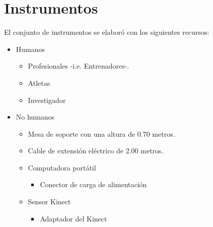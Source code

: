 \section{Instrumentos}\label{ins}
El conjunto de instrumentos se elabor\'o con los  siguientes recursos:
\begin{itemize}
\item Humanos
	\begin{itemize}
	\item Profesionales -i.e. Entrenadores-.
	\item Atletas
	\item Investigador
	\end{itemize}
\item No humanos
	\begin{itemize}
	\item Mesa de soporte con una altura de 0.70 metros.
	\item Cable de extensi\'on el\'ectrico de 2.00 metros. 
	\item Computadora port\'atil
		\begin{itemize}
		\item Conector de carga de alimentaci\'on
		\end{itemize}
	\item Sensor Kinect
		\begin{itemize}
		\item Adaptador del Kinect
		\end{itemize}
	\end{itemize}
\end{itemize}
